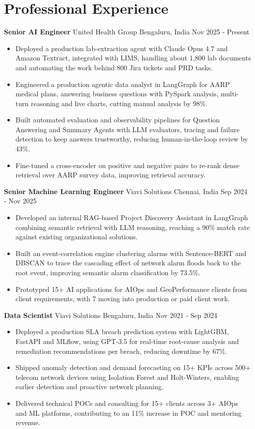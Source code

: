 \documentclass[10pt,a4paper]{article}
\newcommand{\role}[4]{\textbf{#1} \textbar{} #2 \hfill #3 \textbar{} #4\par}
\begin{document}
\section{Professional Experience}
\role{Senior AI Engineer}{United Health Group}{Bengaluru, India}{Nov 2025 - Present}
\begin{itemize}
  \item Deployed a production lab-extraction agent with Claude Opus 4.7 and Amazon Textract, integrated with LIMS, handling about 1,800 lab documents and automating the work behind 800 Jira tickets and PRD tasks.
  \item Engineered a production agentic data analyst in LangGraph for AARP medical plans, answering business questions with PySpark analysis, multi-turn reasoning and live charts, cutting manual analysis by 98\%.
  \item Built automated evaluation and observability pipelines for Question Answering and Summary Agents with LLM evaluators, tracing and failure detection to keep answers trustworthy, reducing human-in-the-loop review by 43\%.
  \item Fine-tuned a cross-encoder on positive and negative pairs to re-rank dense retrieval over AARP survey data, improving retrieval accuracy.
\end{itemize}
\vspace{3pt}
\role{Senior Machine Learning Engineer}{Viavi Solutions}{Chennai, India}{Sep 2024 - Nov 2025}
\begin{itemize}
  \item Developed an internal RAG-based Project Discovery Assistant in LangGraph combining semantic retrieval with LLM reasoning, reaching a 90\% match rate against existing organizational solutions.
  \item Built an event-correlation engine clustering alarms with Sentence-BERT and DBSCAN to trace the cascading effect of network alarm floods back to the root event, improving semantic alarm classification by 73.5\%.
  \item Prototyped 15+ AI applications for AIOps and GeoPerformance clients from client requirements, with 7 moving into production or paid client work.
\end{itemize}
\vspace{3pt}
\role{Data Scientist}{Viavi Solutions}{Bengaluru, India}{Nov 2021 - Sep 2024}
\begin{itemize}
  \item Deployed a production SLA breach prediction system with LightGBM, FastAPI and MLflow, using GPT-3.5 for real-time root-cause analysis and remediation recommendations per breach, reducing downtime by 67\%.
  \item Shipped anomaly detection and demand forecasting on 15+ KPIs across 500+ telecom network devices using Isolation Forest and Holt-Winters, enabling earlier detection and proactive network planning.
  \item Delivered technical POCs and consulting for 15+ clients across 3+ AIOps and ML platforms, contributing to an 11\% increase in POC and mentoring revenue.
\end{itemize}
\end{document}
